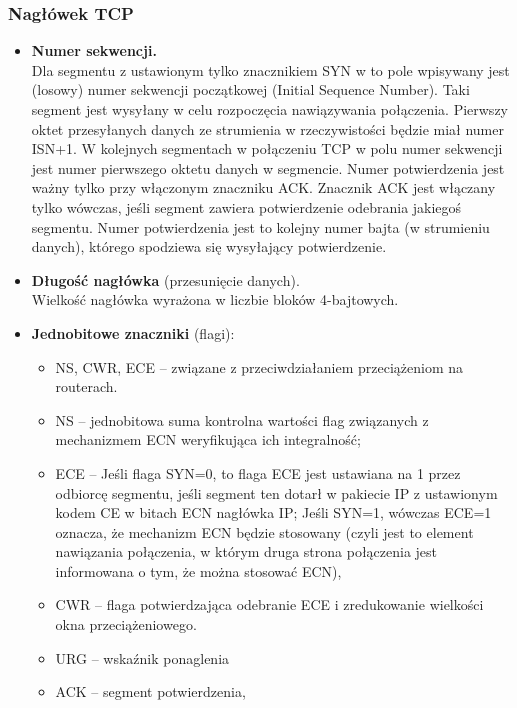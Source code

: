 \documentclass[../main.tex]{subfiles}
\begin{document}
    \subsubsection{Nagłówek TCP}
    \begin{itemize}
        \item \textbf{Numer sekwencji.}\\
        Dla segmentu z ustawionym tylko znacznikiem SYN w to pole wpisywany
        jest (losowy) numer sekwencji początkowej (Initial Sequence Number). Taki segment jest
        wysyłany w celu rozpoczęcia nawiązywania połączenia. Pierwszy oktet przesyłanych danych
        ze strumienia w rzeczywistości będzie miał numer ISN+1.
        W kolejnych segmentach w połączeniu TCP w polu numer sekwencji jest numer pierwszego
        oktetu danych w segmencie.
        Numer potwierdzenia jest ważny tylko przy włączonym znaczniku ACK. Znacznik ACK jest
        włączany tylko wówczas, jeśli segment zawiera potwierdzenie odebrania jakiegoś segmentu.
        Numer potwierdzenia jest to kolejny numer bajta (w strumieniu danych), którego spodziewa
        się wysyłający potwierdzenie.
        \item \textbf{Długość nagłówka} (przesunięcie danych).\\
        Wielkość nagłówka wyrażona w liczbie bloków 4-bajtowych.
        \item \textbf{Jednobitowe znaczniki} (flagi):
        \begin{itemize}
            \item NS, CWR, ECE – związane z przeciwdziałaniem przeciążeniom na routerach.
            \item NS – jednobitowa suma kontrolna wartości flag związanych z
            mechanizmem ECN weryfikująca ich integralność;
            \item ECE – Jeśli flaga SYN=0, to flaga ECE jest ustawiana na 1 przez odbiorcę
            segmentu, jeśli segment ten dotarł w pakiecie IP z ustawionym kodem CE w bitach ECN nagłówka IP;
            Jeśli SYN=1, wówczas ECE=1 oznacza, że mechanizm
            ECN będzie stosowany (czyli jest to element nawiązania połączenia, w którym druga strona
            połączenia jest informowana o tym, że można stosować ECN),
            \item CWR – flaga potwierdzająca odebranie ECE i
            zredukowanie wielkości okna przeciążeniowego.
            \item  URG – wskaźnik ponaglenia
            \item ACK – segment potwierdzenia,

\end{itemize}
\end{itemize}
\end{document}
